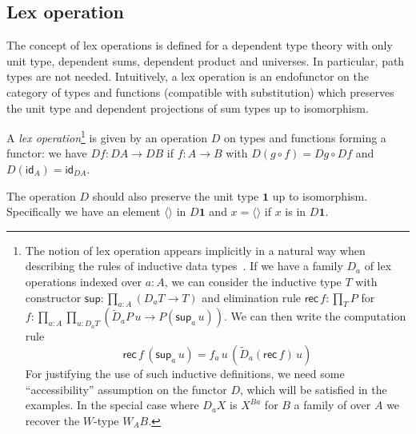 \documentclass[10pt,a4paper,draft]{article}
\newcommand{\Unit}{\mathbf{1}}
\newcommand{\msup}{\mathsf{sup}}
\newcommand{\id}{\mathsf{id}}
\newcommand{\rec}{\mathsf{rec}}
\newcommand{\unitF}{\langle \rangle}
\newcommand{\D}{D}              %
\newcommand{\DD}{\tilde{D}} %
\newcommand{\dd}{\tilde{D}} %
\renewcommand{\~}{\widetilde}
\theoremstyle{definition}
\theoremstyle{remark} %
\begin{document}
\subsection{Lex operation} \label{subsec:lex-operation}

The concept of lex operations is defined for a dependent type theory with only unit type, dependent sums, dependent product and universes.
In particular, path types are not needed.
Intuitively, a lex operation is an endofunctor on the category of types and functions (compatible with substitution) which preserves the unit type and dependent projections of sum types up to isomorphism.

A {\em lex operation}\footnote{The notion of lex operation appears implicitly in a natural way
when describing the rules of inductive data types~\cite{CoquandP88}. If we have a family
$\D_a$ of lex operations indexed over $a:A$, we can consider the inductive type $T$
with constructor $\msup:\prod_{a:A} (\D_aT\rightarrow T)$ and elimination rule
$\rec\,f:\prod_TP$ for $f:\prod_{a:A} \prod_{u:\D_aT} (\DD_aP\,u\rightarrow P(\msup_a\,u))$.
We can then write the computation rule
%
\begin{equation*}
\rec\,f\,(\msup_a\,u) = f_a\,u\,(\dd_a(\rec\,f)\,u)
\end{equation*}
%
For justifying the use of such inductive definitions, we need some ``accessibility'' assumption
on the functor $\D$, which will be satisfied in the examples.
In the special case where $\D_aX$ is $X^{Ba}$ for $B$ a family of over $A$ we recover
the $W$\hyp{}type $W_A B$.}
is given by an operation $\D$ on types and functions forming a functor:
we have $\D f:\D A\rightarrow \D B$ if $f:A\rightarrow B$ with $\D(g\circ f) = \D g\circ \D f$
and $\D(\id_A) = \id_{\D A}$.

The operation $\D$ should also preserve the unit type $\Unit$ up to isomorphism.
Specifically we have an element $\unitF$ in $\D\Unit$ and $x = \unitF$ if $x$ is in $\D\Unit$.
\end{document}
